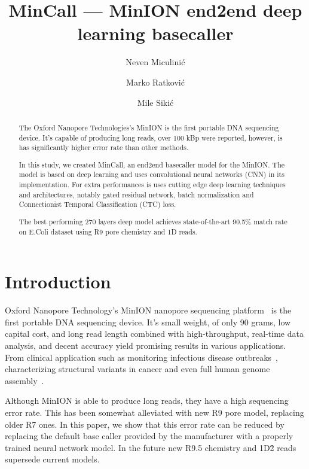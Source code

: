 \documentclass[runningheads,a4paper]{llncs}
\begin{document}
\frontmatter

\title{MinCall --- MinION end2end deep learning basecaller}
\author{Neven Miculinić \and Marko Ratković \and Mile Sikić}
\maketitle

\begin{abstract}
    The Oxford Nanopore Technologies's MinION is the first portable DNA sequencing device. It's capable of producing long reads, over 100 kBp were reported, however, is has significantly higher error rate than other methods.

    In this study, we created MinCall, an end2end basecaller model for the MinION. The model is based on deep learning and uses convolutional neural networks (CNN) in its implementation. For extra performances is uses cutting edge deep learning techniques and architectures, notably gated residual network, batch normalization and Connectionist Temporal Classification (CTC) loss.

    The best performing 270 layers deep model achieves state-of-the-art 90.5\% match rate on E.Coli dataset using R9 pore chemistry and 1D reads.
\end{abstract}

\section{Introduction}

Oxford Nanopore Technology's MinION nanopore sequencing platform~\cite{mikheyev2014first} is the first portable DNA sequencing device. It's small weight, of only 90 grams, low capital cost, and long read length combined with high-throughput, real-time data analysis, and decent accuracy yield promising results in various applications. From clinical application such as monitoring infectious disease outbreaks~\cite{judge2015early}\cite{quick2016real}, characterizing structural variants in cancer\cite{norris2016nanopore} and even full human genome assembly~\cite{jain2017nanopore}.

Although MinION is able to produce long reads, they have a high sequencing error rate. This has been somewhat alleviated with new R9 pore model, replacing older R7 ones. In this paper, we show that this error rate can be reduced by replacing the default base caller provided by the manufacturer with a properly trained neural network model. In the future new R9.5 chemistry and 1D\^2 reads supersede current models.
\end{document}
